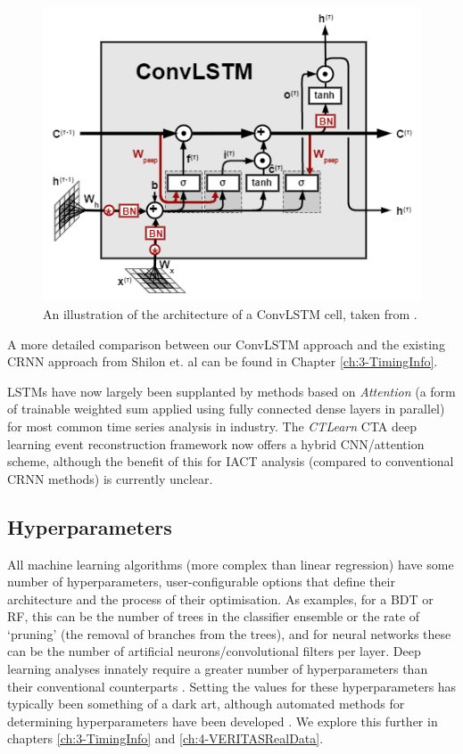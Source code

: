 \begin{figure}[ht] 
        \centering \includegraphics[width=0.5\columnwidth]{figures/convlstmcell.png}
        \caption{
                \label{fig:convlstmcell} %
                An illustration of the architecture of a ConvLSTM cell, taken from \cite{convlstmintro}.
        }
\end{figure}
A more detailed comparison between our ConvLSTM approach and the existing CRNN approach from Shilon et. al \cite{Shilon} can be found in Chapter \ref{ch:3-TimingInfo}.

LSTMs have now largely been supplanted by methods based on \textit{Attention} (a form of trainable weighted sum applied using fully connected dense layers in parallel) for most common time series analysis in industry. The \textit{CTLearn} \cite{tjarkicrc} CTA deep learning event reconstruction framework now offers a hybrid CNN/attention scheme, although the benefit of this for IACT analysis (compared to conventional CRNN methods) is currently unclear.

\subsection{Hyperparameters}
All machine learning algorithms (more complex than linear regression) have some number of hyperparameters, user-configurable options that define their architecture and the process of their optimisation. As examples, for a BDT or RF, this can be the number of trees in the classifier ensemble or the rate of `pruning' (the removal of branches from the trees), and for neural networks these can be the number of artificial neurons/convolutional filters per layer. Deep learning analyses innately require a greater number of hyperparameters than their conventional counterparts \cite{hyperopt}. Setting the values for these hyperparameters has typically been something of a dark art, although automated methods for determining hyperparameters have been developed \cite{hyperopt}. We explore this further in chapters \ref{ch:3-TimingInfo} and \ref{ch:4-VERITASRealData}.

